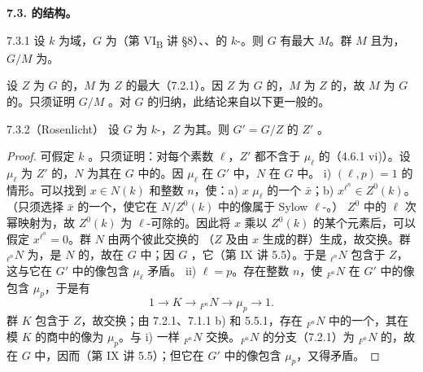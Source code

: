 \textbf{7.3. 的结构。}
\begin{SGAresult}{}{7.3.1}
设 $k$ 为域，$G$ 为（第 VI\textsubscript{B} 讲 §8）、、的 $k$-。则 $G$ 有最大 $M$。群 $M$ 且为，$G/M$ 为。
\end{SGAresult}
设 $Z$ 为 $G$ 的，$M$ 为 $Z$ 的最大（7.2.1）。因 $Z$ 为 $G$ 的，$M$ 为 $Z$ 的，故 $M$ 为 $G$ 的。只须证明 $G/M$ 。对 $G$ 的归纳，此结论来自以下更一般的。
\begin{SGAresult}{}{7.3.2（Rosenlicht）}
设 $G$ 为 $k$-，$Z$ 为其。则 $G'=G/Z$ 的 $Z'$ 。
\end{SGAresult}
\begin{proof}
可假定 $k$ 。只须证明：对每个素数 $\ell$，$Z'$ 都不含于 $\mu_\ell$ 的（4.6.1 vi)）。设 $\mu_\ell$ 为 $Z'$ 的，$N$ 为其在 $G$ 中的。因 $\mu_\ell$ 在 $G'$ 中，$N$ 在 $G$ 中。
i) $(\ell,p)=1$ 的情形。可以找到 $x\in N(k)$ 和整数 $n$，使：a) $x$  $\mu_\ell$ 的一个 $\bar x$；b) $x^{\ell^n}\in Z^0(k)$。（只须选择 $\bar x$ 的一个，使它在 $N/Z^0(k)$ 中的像属于 Sylow $\ell$-。）
 $Z^0$ 中的 $\ell$ 次幂映射为，故 $Z^0(k)$ 为 $\ell$-可除的。因此将 $x$ 乘以 $Z^0(k)$ 的某个元素后，可以假定 $x^{\ell^n}=0$。群 $N$ 由两个彼此交换的
（$Z$ 及由 $x$ 生成的群）生成，故交换。群 ${}_{\ell^n}N$ 为，是 $N$ 的，故在 $G$ 中；因 $G$ ，它（第 IX 讲 5.5）。于是 ${}_{\ell^n}N$ 包含于 $Z$，这与它在 $G'$ 中的像包含 $\mu_\ell$ 矛盾。
ii) $\ell=p$。存在整数 $n$，使 ${}_{F^n}N$ 在 $G'$ 中的像包含 $\mu_p$，于是有
\[1\longrightarrow K\longrightarrow{}_{F^n}N\longrightarrow\mu_p\longrightarrow1.\tag{*}\]
群 $K$ 包含于 $Z$，故交换；由 7.2.1、7.1.1 b) 和 5.5.1，存在 ${}_{F^n}N$ 中的一个，其在模 $K$ 的商中的像为 $\mu_p$。与 i) 一样 ${}_{F^n}N$ 交换。${}_{F^n}N$ 的分支（7.2.1）为 ${}_{F^n}N$ 的，故在 $G$ 中，因而（第 IX 讲 5.5）；但它在 $G'$ 中的像包含 $\mu_p$，又得矛盾。
\end{proof}

